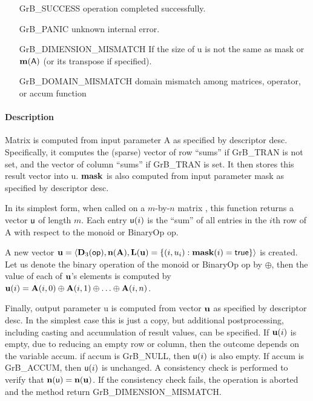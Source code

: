 \begin{itemize}[leftmargin=2.1in]
\item[{\sf GrB\_SUCCESS}]    operation completed successfully.
\item[{\sf GrB\_PANIC}]      unknown internal error.
\item[{\sf GrB\_DIMENSION\_MISMATCH}]            
        If the size of {\sf u} is not the same as {\sf mask} or $\bold{m}({\sf A})$ (or its transpose if specified).
\item[{\sf GrB\_DOMAIN\_MISMATCH}]  
        domain mismatch among matrices, operator, or
        accum function 
\end{itemize}


\paragraph{Description}

Matrix  is computed from input parameter {\sf A} as specified
by descriptor {\sf desc}. Specifically, it computes the (sparse) vector of row ``sums'' if 
GrB\_TRAN  is not set, and the vector of column ``sums'' if GrB\_TRAN  is set. It then
stores this result vector into {\sf u}. ${\bf mask}$ is also computed from input parameter {\sf mask}
as specified by descriptor {\sf desc}.

In its simplest form, when called on a $m$-by-$n$ matrix , this function returns a vector ${\sf u}$ 
of length $m$. Each entry ${\sf u}(i)$ is the ``sum'' of all entries in the $i$th row of 
{\sf A} with respect to the monoid or BinaryOp {\sf op}. 


A new vector ${\bf u} = \langle \bold{D}_3({\sf op}),
\bold{n}({\bf A}), \bold{L}({\bf u}) = \{(i,u_i) : {\bf mask}(i)
= {\sf true} \} \rangle$ is created.  Let us denote the binary operation of the monoid or BinaryOp {\sf op} by $\oplus$,
then the value of each of ${\bf u}$'s elements
is computed by $ {\bf u}(i) = {\bf A}(i,0) \oplus {\bf A}(i,1) \oplus  \ldots \oplus  {\bf A}(i,n)$.  
 

Finally, output parameter {\sf u} is computed from vector ${\bf u}$
as specified by descriptor {\sf desc}. In the simplest case this
is just a copy, but additional postprocessing, including casting and
accumulation of result values, can be specified. 
 If ${\bf u}(i)$ is empty, due to reducing an empty row or column, then the outcome depends on the variable {\sf accum}.
  if {\sf accum} is GrB\_NULL, then ${\sf u}(i)$ is also empty. If {\sf accum} is GrB\_ACCUM, then ${\sf u}(i)$ is unchanged.
A consistency check is
performed to verify that $\bold{n}({\sf u}) = \bold{n}({\bf u})$. If
the consistency check fails, the operation is aborted and the method
return {\sf GrB\_DIMENSION\_MISMATCH}.


